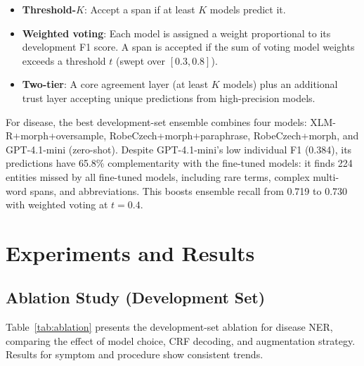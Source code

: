 \documentclass[11pt]{article}
\begin{document}
\begin{itemize}
  \item \textbf{Threshold-$K$}: Accept a span if at least $K$ models predict it.
  \item \textbf{Weighted voting}: Each model is assigned a weight proportional to its
        development F1 score. A span is accepted if the sum of voting model weights
        exceeds a threshold $t$ (swept over $[0.3, 0.8]$).
  \item \textbf{Two-tier}: A core agreement layer (at least $K$ models) plus an
        additional trust layer accepting unique predictions from high-precision models.
\end{itemize}

For disease, the best development-set ensemble combines four models: XLM-R+morph+oversample,
RobeCzech+morph+paraphrase, RobeCzech+morph, and GPT-4.1-mini (zero-shot). Despite
GPT-4.1-mini's low individual F1 (0.384), its predictions have 65.8\% complementarity
with the fine-tuned models: it finds 224 entities missed by all fine-tuned models,
including rare terms, complex multi-word spans, and abbreviations. This boosts ensemble
recall from 0.719 to 0.730 with weighted voting at $t=0.4$.

\section{Experiments and Results}

\subsection{Ablation Study (Development Set)}

Table~\ref{tab:ablation} presents the development-set ablation for disease NER, comparing
the effect of model choice, CRF decoding, and augmentation strategy. Results for
symptom and procedure show consistent trends.
\end{document}
